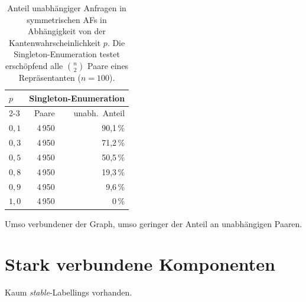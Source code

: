 \begin{table}[htbp]
    \myfloatalign
    \centering
    \begin{tabular}{l r r} \toprule
        \(p\) & \multicolumn{2}{c}{Singleton-Enumeration} \\
        \cmidrule(lr){2-3}
              & Paare & unabh.\ Anteil \\ \midrule
        \(0{,}1\) & 4\,950 & 90{,}1\,\% \\
        \(0{,}3\) & 4\,950 & 71{,}2\,\% \\
        \(0{,}5\) & 4\,950 & 50{,}5\,\% \\
        \(0{,}8\) & 4\,950 & 19{,}3\,\% \\
        \(0{,}9\) & 4\,950 & 9{,}6\,\% \\
        \(1{,}0\) & 4\,950 & 0\,\%  \\
        \bottomrule
    \end{tabular}
    \caption[Unabh\"angigkeitsrate symmetrischer AFs nach Kantenwahrscheinlichkeit]{Anteil
    unabh\"angiger Anfragen in symmetrischen AFs in Abh\"angigkeit von der
    Kantenwahrscheinlichkeit \(p\). Die Singleton-Enumeration testet
    ersch\"opfend alle \(\binom{n}{2}\) Paare eines Repr\"asentanten (\(n=100\)).}
    \label{tab:gce-sym}
\end{table}
Umso verbundener der Graph, umso geringer der Anteil an unabhängigen Paaren. 


\section{Stark verbundene Komponenten}
\label{sec:scc-afs}

Kaum \emph{stable}-Labellings vorhanden. 


\fi
\fi
